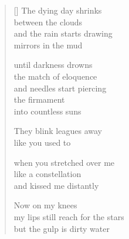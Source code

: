 \documentclass[12pt,a4paper]{article}
\begin{document}
\begin{verse}[\versewidth]
  The dying day shrinks \\
  between the clouds \\
  and the rain starts drawing \\
  mirrors in the mud

  until darkness drowns \\
  the match of eloquence \\
  and needles start piercing \\
  the firmament \\
  into countless suns

  They blink leagues away \\
  like you used to

  when you stretched over me \\
  like a constellation \\
  and kissed me distantly

  Now on my knees \\
  my lips still reach for the stars \\
  but the gulp is dirty water
\end{verse}


\newpage

\poemtitle{}

\settowidth{\versewidth}{like those of a silent film actor}

\bigskip
\end{document}
